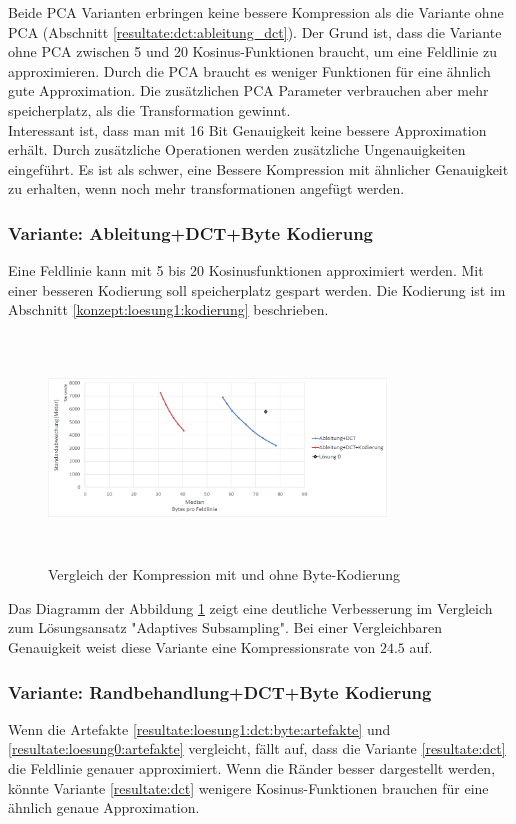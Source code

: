 Beide PCA Varianten erbringen keine bessere Kompression als die Variante ohne PCA (Abschnitt  \ref{resultate:dct:ableitung_dct}). Der Grund ist, dass die Variante ohne PCA zwischen 5 und 20 Kosinus-Funktionen braucht, um eine Feldlinie zu approximieren. Durch die PCA braucht es weniger Funktionen für eine ähnlich gute Approximation. Die zusätzlichen PCA Parameter verbrauchen aber mehr speicherplatz, als die Transformation gewinnt.\\
Interessant ist, dass man mit 16 Bit Genauigkeit keine bessere Approximation erhält. Durch zusätzliche Operationen werden zusätzliche Ungenauigkeiten eingeführt. Es ist als schwer, eine Bessere Kompression mit ähnlicher Genauigkeit zu erhalten, wenn noch mehr transformationen angefügt werden.

\subsubsection{Variante: Ableitung+DCT+Byte Kodierung} \label{resultate:loesung1:ableitung_dct_kodierung}
Eine Feldlinie kann mit 5 bis 20 Kosinusfunktionen approximiert werden. Mit einer besseren Kodierung soll speicherplatz gespart werden. Die Kodierung ist im Abschnitt \ref{konzept:loesung1:kodierung} beschrieben.
\begin{figure}[!htbp]
	\center
	\includegraphics[width=0.8\textwidth,height=6cm,keepaspectratio]{./pictures/resultate/loesung1/loesung1-6/loesung1_6.png}
	\caption{Vergleich der Kompression mit und ohne Byte-Kodierung}
	\label{resultate:loesung1:dct:kodierung}
\end{figure}
Das Diagramm der Abbildung \ref{resultate:loesung1:dct:kodierung} zeigt eine deutliche Verbesserung im Vergleich zum Lösungsansatz "Adaptives Subsampling". Bei einer Vergleichbaren Genauigkeit weist diese Variante eine Kompressionsrate von $24.5$ auf.

\subsubsection{Variante: Randbehandlung+DCT+Byte Kodierung} \label{resultate:loesung1:dct:randbeh+byte}
Wenn  die Artefakte \ref{resultate:loesung1:dct:byte:artefakte} und \ref{resultate:loesung0:artefakte} vergleicht, fällt auf, dass die Variante \ref{resultate:dct} die Feldlinie genauer approximiert. Wenn die Ränder besser dargestellt werden, könnte Variante \ref{resultate:dct} wenigere Kosinus-Funktionen brauchen für eine ähnlich genaue Approximation.\\

